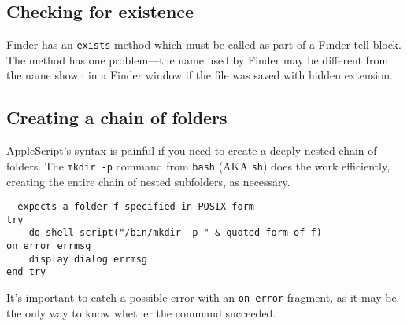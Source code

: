 \documentclass[11pt]{amsart}
\begin{document}
\subsection{Checking for existence}
Finder has an {\tt exists} method which must be called as part of a Finder tell block. The method has one problem---the name used by Finder may be different from the name shown in a Finder window if the file was saved with hidden extension. 
\subsection{Creating a chain of folders}
AppleScript's syntax is painful if you need to create a deeply nested chain of folders. The {\tt mkdir -p} command from {\tt bash} (AKA {\tt sh}) does the work efficiently, creating the entire chain of nested subfolders, as necessary.
\begin{verbatim}
--expects a folder f specified in POSIX form
try
    do shell script("/bin/mkdir -p " & quoted form of f)
on error errmsg
    display dialog errmsg
end try
\end{verbatim}
It's important to catch a possible error with an {\tt on error} fragment, as it may be the only way to know whether the command succeeded.
\end{document}
